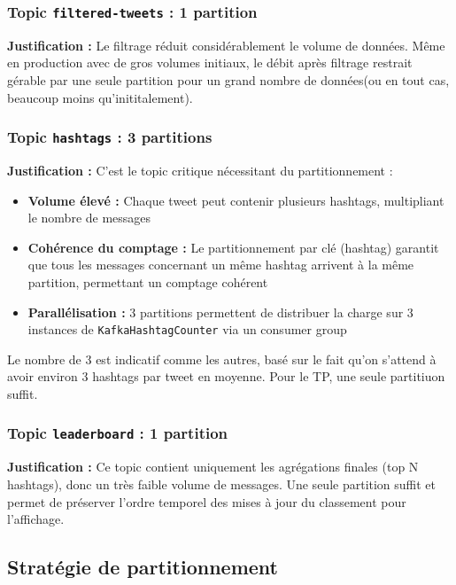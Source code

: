 \documentclass[10pt,a4paper]{article}
\begin{document}
\subsubsection{Topic \texttt{filtered-tweets} : 1 partition}

\textbf{Justification :} Le filtrage réduit considérablement le volume de données. Même en production avec de gros volumes initiaux, le débit après filtrage restrait gérable par une seule partition pour un grand nombre de données(ou en tout cas, beaucoup moins qu'inititalement). 

\subsubsection{Topic \texttt{hashtags} : 3 partitions}

\textbf{Justification :} C'est le topic critique nécessitant du partitionnement :
\begin{itemize}
    \item \textbf{Volume élevé :} Chaque tweet peut contenir plusieurs hashtags, multipliant le nombre de messages
    \item \textbf{Cohérence du comptage :} Le partitionnement par clé (hashtag) garantit que tous les messages concernant un même hashtag arrivent à la même partition, permettant un comptage cohérent
    \item \textbf{Parallélisation :} 3 partitions permettent de distribuer la charge sur 3 instances de \texttt{KafkaHashtagCounter} via un consumer group
\end{itemize}

Le nombre de 3 est indicatif comme les autres, basé sur le fait qu'on s'attend à avoir environ 3 hashtags par tweet en moyenne. Pour le TP, une seule partitiuon suffit. 

\subsubsection{Topic \texttt{leaderboard} : 1 partition}

\textbf{Justification :} Ce topic contient uniquement les agrégations finales (top N hashtags), donc un très faible volume de messages. Une seule partition suffit et permet de préserver l'ordre temporel des mises à jour du classement pour l'affichage.

\subsection{Stratégie de partitionnement}
\end{document}
